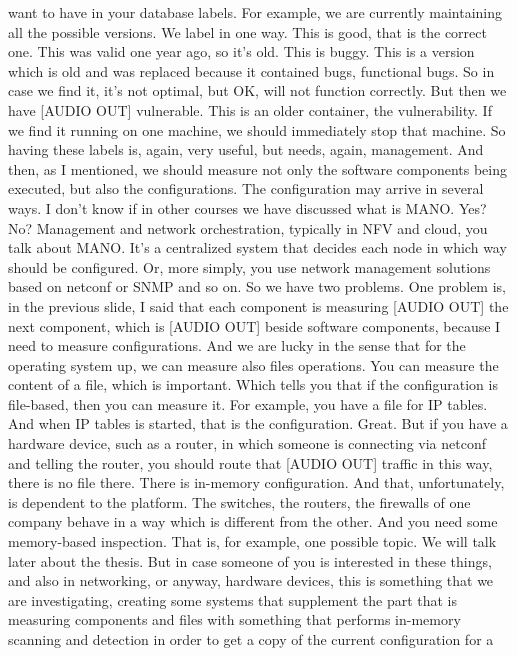  want to have in your database labels. For example, we are currently
 maintaining all the possible versions. We label in one way. This is good, that
 is the correct one. This was valid one year ago, so it's old. This is buggy.
 This is a version which is old and was replaced because it contained bugs,
 functional bugs. So in case we find it, it's not optimal, but OK, will not
 function correctly. But then we have [AUDIO OUT] vulnerable. This is an older
 container, the vulnerability. If we find it running on one machine, we should
 immediately stop that machine. So having these labels is, again, very useful,
 but needs, again, management. And then, as I mentioned, we should measure not
 only the software components being executed, but also the configurations. The
 configuration may arrive in several ways. I don't know if in other courses we
 have discussed what is MANO. Yes? No? Management and network orchestration,
 typically in NFV and cloud, you talk about MANO. It's a centralized system
 that decides each node in which way should be configured. Or, more simply, you
 use network management solutions based on netconf or SNMP and so on. So we
 have two problems. One problem is, in the previous slide, I said that each
 component is measuring [AUDIO OUT] the next component, which is [AUDIO OUT]
 beside software components, because I need to measure configurations. And we
 are lucky in the sense that for the operating system up, we can measure also
 files operations. You can measure the content of a file, which is important.
 Which tells you that if the configuration is file-based, then you can measure
 it. For example, you have a file for IP tables. And when IP tables is started,
 that is the configuration. Great. But if you have a hardware device, such as a
 router, in which someone is connecting via netconf and telling the router, you
 should route that [AUDIO OUT] traffic in this way, there is no file there.
 There is in-memory configuration. And that, unfortunately, is dependent to the
 platform. The switches, the routers, the firewalls of one company behave in a
 way which is different from the other. And you need some memory-based
 inspection. That is, for example, one possible topic. We will talk later about
 the thesis. But in case someone of you is interested in these things, and also
 in networking, or anyway, hardware devices, this is something that we are
 investigating, creating some systems that supplement the part that is
 measuring components and files with something that performs in-memory scanning
 and detection in order to get a copy of the current configuration for a
